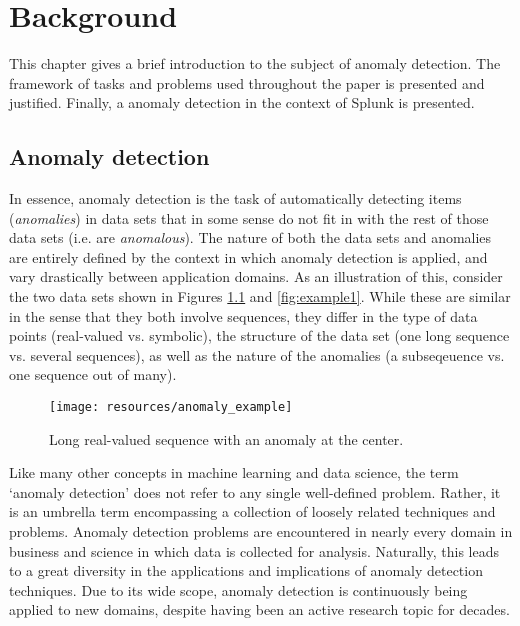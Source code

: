 \chapter{Background}
\label{ch:background}

This chapter gives a brief introduction to the subject of anomaly detection. The framework of tasks and problems used throughout the paper is presented and justified. Finally, a anomaly detection in the context of Splunk is presented.

\section{Anomaly detection}
\label{sect:adb}

In essence, anomaly detection is the task of automatically detecting items (\emph{anomalies}) in data sets that in some sense do not fit in with the rest of those data sets (i.e. are \emph{anomalous}). The nature of both the data sets and anomalies are entirely defined by the context in which anomaly detection is applied, and vary drastically between application domains. As an illustration of this, consider the two data sets shown in Figures \ref{fig:example2} and \ref{fig:example1}. While these are similar in the sense that they both involve sequences, they differ in the type of data points (real-valued vs. symbolic), the structure of the data set (one long sequence vs. several sequences), as well as the nature of the anomalies (a subseqeuence vs. one sequence out of many).

\begin{figure}[htb]
    \centering
    \texttt{[image: resources/anomaly\_example]}
    \caption{\small Long real-valued sequence with an anomaly at the center.}
    \vspace{-0pt}
    \label{fig:example2}
\end{figure}

Like many other concepts in machine learning and data science, the term `anomaly detection' does not refer to any single well-defined problem. Rather, it is an umbrella term encompassing a collection of loosely related techniques and problems. Anomaly detection problems are encountered in nearly every domain in business and science in which data is collected for analysis. Naturally, this leads to a great diversity in the applications and implications of anomaly detection techniques. Due to its wide scope, anomaly detection is continuously being applied to new domains, despite having been an active research topic for decades.

